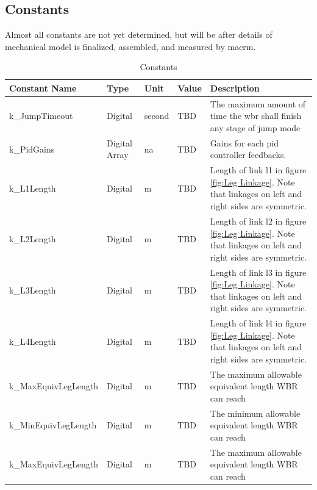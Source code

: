 \documentclass[12pt]{article}
\begin{document}
    \subsection{Constants}
        Almost all constants are not yet determined, but will be after details of mechanical model is finalized, assembled, and measured by \acrshort{macrm}.
        \begin{table}[H]
            \caption{Constants}
            \begin{tabularx}{\textwidth}{|p{6cm}|p{1.5cm}|p{1.25cm}|p{1cm}|X|}
                \toprule
                \textbf{Constant Name} & \textbf{Type} & \textbf{Unit} & \textbf{Value} & \textbf{Description} \\
                \midrule
                k\_JumpTimeout         & Digital       & \si{second} & TBD & The maximum amount of time the \acrshort{wbr} shall finish any stage of jump mode                     \\
                k\_PidGains            & Digital Array & \acrshort{na} &TBD & Gains for each \acrshort{pid} controller feedbacks.                                                   \\
                k\_L1Length            & Digital       & \si{m}      & TBD & Length of link l1 in figure \ref{fig:Leg Linkage}. Note that linkages on left and right sides are symmetric. \\
                k\_L2Length            & Digital       & \si{m}    &  TBD  & Length of link l2 in figure \ref{fig:Leg Linkage}. Note that linkages on left and right sides are symmetric. \\
                k\_L3Length            & Digital       & \si{m}    &  TBD  & Length of link l3 in figure \ref{fig:Leg Linkage}. Note that linkages on left and right sides are symmetric. \\
                k\_L4Length            & Digital       & \si{m}     & TBD  & Length of link l4 in figure \ref{fig:Leg Linkage}. Note that linkages on left and right sides are symmetric. \\
                k\_MaxEquivLegLength              & Digital       & \si{m}    & TBD   & The maximum allowable equivalent length WBR can reach                                         \\
                k\_MinEquivLegLength              & Digital       & \si{m}    & TBD   & The minimum allowable equivalent length WBR can reach                                          \\
                k\_MaxEquivLegLength              & Digital       & \si{m}    & TBD   & The maximum allowable equivalent length WBR can reach                                         \\

\end{tabularx}
\end{table}
\end{document}
